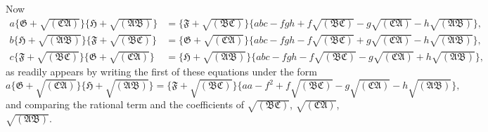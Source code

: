 \documentclass[11pt,a4paper]{book}
\begin{document}
Now
\begin{align*}
a\{\mathfrak{G} + \sqrt{(\mathfrak{C}\mathfrak{A})}\}\{\mathfrak{H} + \sqrt{(\mathfrak{A}\mathfrak{B})}\} &= \{\mathfrak{F} + \sqrt{(\mathfrak{B}\mathfrak{C})}\}\{abc - fgh + f\sqrt{(\mathfrak{B}\mathfrak{C})} - g\sqrt{(\mathfrak{C}\mathfrak{A})} - h\sqrt{(\mathfrak{A}\mathfrak{B})}\}, \\
b\{\mathfrak{H} + \sqrt{(\mathfrak{A}\mathfrak{B})}\}\{\mathfrak{F} + \sqrt{(\mathfrak{B}\mathfrak{C})}\} &= \{\mathfrak{G} + \sqrt{(\mathfrak{C}\mathfrak{A})}\}\{abc - fgh - f\sqrt{(\mathfrak{B}\mathfrak{C})} + g\sqrt{(\mathfrak{C}\mathfrak{A})} - h\sqrt{(\mathfrak{A}\mathfrak{B})}\}, \\
c\{\mathfrak{F} + \sqrt{(\mathfrak{B}\mathfrak{C})}\}\{\mathfrak{G} + \sqrt{(\mathfrak{C}\mathfrak{A})}\} &= \{\mathfrak{H} + \sqrt{(\mathfrak{A}\mathfrak{B})}\}\{abc - fgh - f\sqrt{(\mathfrak{B}\mathfrak{C})} - g\sqrt{(\mathfrak{C}\mathfrak{A})} + h\sqrt{(\mathfrak{A}\mathfrak{B})}\},
\end{align*}
{as readily appears by writing the first of these equations under the form
\[
a\{\mathfrak{G} + \sqrt{(\mathfrak{C}\mathfrak{A})}\}\{\mathfrak{H} + \sqrt{(\mathfrak{A}\mathfrak{B})}\} = \{\mathfrak{F} + \sqrt{(\mathfrak{B}\mathfrak{C})}\}\{aa - f^{2} + f\sqrt{(\mathfrak{B}\mathfrak{C})} - g\sqrt{(\mathfrak{C}\mathfrak{A})} - h\sqrt{(\mathfrak{A}\mathfrak{B})}\},
\]
and comparing the rational term and the coefficients of $\sqrt{(\mathfrak{B}\mathfrak{C})}$, $\sqrt{(\mathfrak{C}\mathfrak{A})}$, $\sqrt{(\mathfrak{A}\mathfrak{B})}$}.

\newpage

\setcounter{page}{467}
\end{document}
